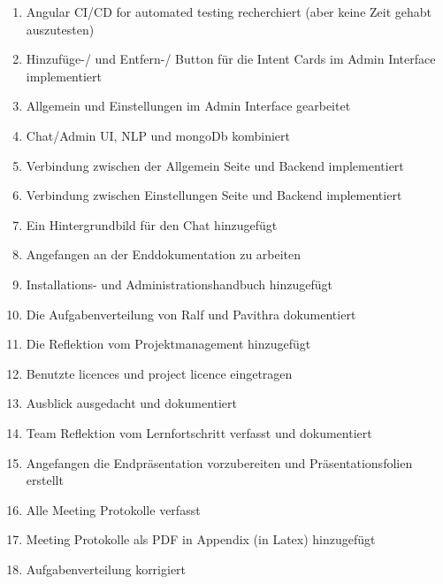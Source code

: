 \begin{enumerate}
    \item Angular CI/CD for automated testing recherchiert (aber keine Zeit gehabt auszutesten)
    \item Hinzufüge-/ und Entfern-/ Button für die Intent Cards im Admin Interface implementiert
    \item Allgemein und Einstellungen im Admin Interface gearbeitet
    \item Chat/Admin UI, NLP und mongoDb kombiniert
    \item Verbindung zwischen der Allgemein Seite und Backend implementiert
    \item Verbindung zwischen Einstellungen Seite und Backend implementiert
    \item Ein Hintergrundbild für den Chat hinzugefügt
    \item Angefangen an der Enddokumentation zu arbeiten
    \item Installations- und Administrationshandbuch hinzugefügt
    \item Die Aufgabenverteilung von Ralf und Pavithra dokumentiert
    \item Die Reflektion vom Projektmanagement hinzugefügt
    \item Benutzte licences und project licence eingetragen
    \item Ausblick ausgedacht und dokumentiert
    \item Team Reflektion vom Lernfortschritt verfasst und dokumentiert
    \item Angefangen die Endpräsentation vorzubereiten und Präsentationsfolien erstellt
    \item Alle Meeting Protokolle verfasst
    \item Meeting Protokolle als PDF in Appendix (in Latex) hinzugefügt
    \item Aufgabenverteilung korrigiert
\end{enumerate}

